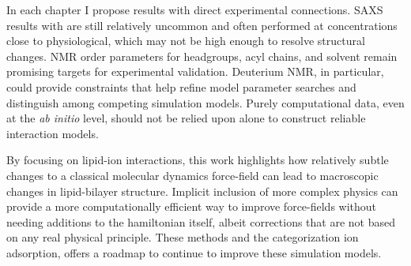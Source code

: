 In each chapter I propose results with direct experimental
connections. SAXS results with \mg{} are still relatively uncommon
and often performed at concentrations close to physiological, which
may not be high enough to resolve structural changes. NMR order
parameters for headgroups, acyl chains, and solvent remain promising
targets for experimental validation. Deuterium NMR, in particular,
could provide constraints that help refine model parameter searches
and distinguish among competing simulation models. Purely
computational data, even at the \emph{ab initio} level, should not
be relied upon alone to construct reliable interaction models.

By focusing on lipid-ion interactions, this work highlights how relatively subtle changes to a classical molecular dynamics force-field 
can lead to macroscopic changes in lipid-bilayer structure. Implicit inclusion of more complex physics can provide a more computationally efficient way to 
improve force-fields without needing additions to the hamiltonian itself, albeit corrections that are not based on any real physical principle. These methods and the categorization 
ion adsorption, offers a roadmap to continue to improve these simulation models.





